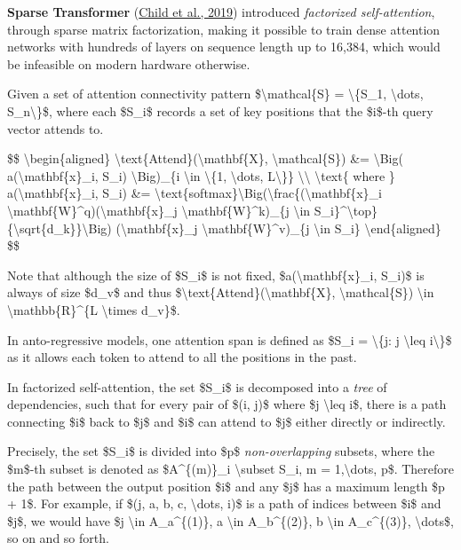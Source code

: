 \textbf{Sparse Transformer} (\href{https://arxiv.org/abs/1904.10509}{Child et al., 2019}) introduced \emph{factorized self-attention}, through sparse matrix factorization, making it possible to train dense attention networks with hundreds of layers on sequence length up to 16,384, which would be infeasible on modern hardware otherwise.

Given a set of attention connectivity pattern \$\textbackslash mathcal\{S\} = \textbackslash\{S\_1, \textbackslash dots, S\_n\textbackslash\}\$, where each \$S\_i\$ records a set of key positions that the \$i\$-th query vector attends to.

\$\$ \textbackslash begin\{aligned\} \textbackslash text\{Attend\}(\textbackslash mathbf\{X\}, \textbackslash mathcal\{S\}) \&= \textbackslash Big( a(\textbackslash mathbf\{x\}\_i, S\_i) \textbackslash Big)\_\{i \textbackslash in \textbackslash\{1, \textbackslash dots, L\textbackslash\}\} \textbackslash\textbackslash{} \textbackslash text\{ where \} a(\textbackslash mathbf\{x\}\_i, S\_i) \&= \textbackslash text\{softmax\}\textbackslash Big(\textbackslash frac\{(\textbackslash mathbf\{x\}\_i \textbackslash mathbf\{W\}\^{}q)(\textbackslash mathbf\{x\}\_j \textbackslash mathbf\{W\}\^{}k)\_\{j \textbackslash in S\_i\}\^{}\textbackslash top\}\{\textbackslash sqrt\{d\_k\}\}\textbackslash Big) (\textbackslash mathbf\{x\}\_j \textbackslash mathbf\{W\}\^{}v)\_\{j \textbackslash in S\_i\} \textbackslash end\{aligned\} \$\$

Note that although the size of \$S\_i\$ is not fixed, \$a(\textbackslash mathbf\{x\}\_i, S\_i)\$ is always of size \$d\_v\$ and thus \$\textbackslash text\{Attend\}(\textbackslash mathbf\{X\}, \textbackslash mathcal\{S\}) \textbackslash in \textbackslash mathbb\{R\}\^{}\{L \textbackslash times d\_v\}\$.

In anto-regressive models, one attention span is defined as \$S\_i = \textbackslash\{j: j \textbackslash leq i\textbackslash\}\$ as it allows each token to attend to all the positions in the past.

In factorized self-attention, the set \$S\_i\$ is decomposed into a \emph{tree} of dependencies, such that for every pair of \$(i, j)\$ where \$j \textbackslash leq i\$, there is a path connecting \$i\$ back to \$j\$ and \$i\$ can attend to \$j\$ either directly or indirectly.

Precisely, the set \$S\_i\$ is divided into \$p\$ \emph{non-overlapping} subsets, where the \$m\$-th subset is denoted as \$A\^{}\{(m)\}\_i \textbackslash subset S\_i, m = 1,\textbackslash dots, p\$. Therefore the path between the output position \$i\$ and any \$j\$ has a maximum length \$p + 1\$. For example, if \$(j, a, b, c, \textbackslash dots, i)\$ is a path of indices between \$i\$ and \$j\$, we would have \$j \textbackslash in A\_a\^{}\{(1)\}, a \textbackslash in A\_b\^{}\{(2)\}, b \textbackslash in A\_c\^{}\{(3)\}, \textbackslash dots\$, so on and so forth.

